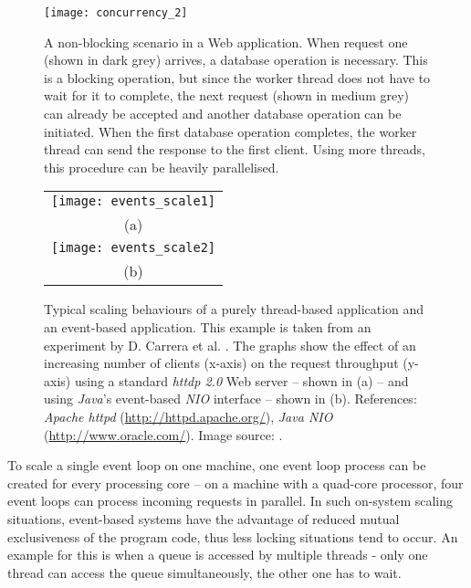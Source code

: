 \begin{figure}
\centering\small
\setlength{\tabcolsep}{0mm}
  \texttt{[image: concurrency\_2]}
\caption{
A non-blocking scenario in a Web application. When request one (shown in dark grey) arrives, a database operation is necessary. This is a blocking operation, but since the worker thread does not have to wait for it to complete, the next request (shown in medium grey) can already be accepted and another database operation can be initiated. When the first database operation completes, the worker thread can send the response to the first client. Using more threads, this procedure can be heavily parallelised. 
}
\label{fig:concurrency_2}
\end{figure}

\begin{figure}
\centering\small
\begin{tabular}{c@{\hspace{12mm}}}
  \texttt{[image: events\_scale1]} \\
  (a)
\\[14pt]
  \texttt{[image: events\_scale2]} \\
  (b)
\end{tabular}
\caption{Typical scaling behaviours of a purely thread-based application and an event-based application. This example is taken from an experiment by D. Carrera et al. \cite{Carrera}. The graphs show the effect of an increasing number of clients (x-axis) on the request throughput (y-axis) using a standard \textit{httdp 2.0} Web server -- shown in (a) -- and using \textit{Java}'s event-based \textit{NIO} interface -- shown in (b). References: \textit{Apache httpd} (\url{http://httpd.apache.org/}), \textit{Java NIO} (\url{http://www.oracle.com/}). Image source: \cite{Carrera}.} 
\label{fig:events_scale}
\end{figure}
 
To scale a single event loop on one machine, one event loop process can be created for every processing core -- on a machine with a quad-core processor, four event loops can process incoming requests in parallel. In such on-system scaling situations, event-based systems have the advantage of reduced mutual exclusiveness of the program code, thus less locking situations tend to occur. An example for this is when a queue is accessed by multiple threads - only one thread can access the queue simultaneously, the other one has to wait.

